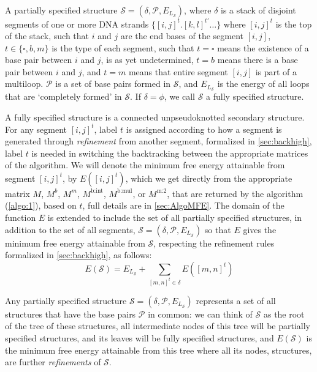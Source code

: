 \begin{Definition}
	A partially specified structure $\mathcal{S} = (\delta,\mathcal{P},E_{L_\mathcal{S}})$, where $\delta$ is a stack of disjoint segments of one or more DNA strands $\{[i,j]^t. [k,l]^{t'} \ldots\}$ where $[i,j]^t$ is the top of the stack, such that $i$ and $j$ are the end bases of the segment $[i,j]$, $t \in \{\square,b,m\}$ is the type of each segment, 
	such that $t = \square$ means the existence of a base pair between $i$ and $j$, is as yet undetermined, 
	$t =b$ means there is a base pair between $i$ and $j$, and 
	$t = m$ means that entire segment $[i,j]$ is part of a multiloop. 
	$\mathcal{P}$ is a set of base pairs formed in $\mathcal{S}$, and $E_{L_\mathcal{S}}$ is the energy of all loops that are 
	`completely formed' in $\mathcal{S}$. If $\delta = \phi$, we call $\mathcal{S}$ a fully specified structure.
\end{Definition}

A fully specified structure is a connected unpseudoknotted secondary structure. For any segment $[i,j]^t$,  label $t$ is assigned according to how a segment is generated through \emph{refinement} from another segment, formalized in \cref{sec:backhigh}, 
label $t$ is needed in switching the backtracking between the appropriate matrices of the \snMFE algorithm.
We will denote the minimum free energy attainable from segment $[i,j]^t$, by $E([i,j]^t)$, which we get directly from the appropriate matrix $M$, $M^b$, $M^m$, $M^\text{b:int}$, $M^\text{b:mul}$, or $M^\text{m:2}$, that are returned  by the \snMFE algorithm (\cref{algo:1}), based on $t$, full details are in \cref{sec:AlgoMFE}. 
The domain of the  function $E$ is extended to include the set of all partially specified structures, in addition to the set of all segments,   
$\mathcal{S} = (\delta,\mathcal{P},E_{L_\mathcal{S}})$ so that 
$E$ gives  the minimum free energy attainable from $\mathcal{S}$, 
respecting the refinement rules formalized in \cref{sec:backhigh}, as follows:
\begin{equation}\label{eq:ES}
	E(\mathcal{S}) = E_{L_{\mathcal{S}}} 
	+ \sum \limits_{[m,n]^t \in \delta} E([m,n]^t)
\end{equation}

Any partially specified structure $\mathcal{S} = (\delta,\mathcal{P},E_{L_\mathcal{S}})$ represents a set of all structures that have the base pairs $\mathcal{P}$ in common:  we can think of $\mathcal{S}$ as the root of the tree of these structures, all intermediate nodes of this tree will be partially specified structures, and its leaves will be fully specified structures, and $E(\mathcal{S})$ is the minimum free energy attainable from this tree where all its nodes, structures, are further \emph{refinements} of $\mathcal{S}$.   

